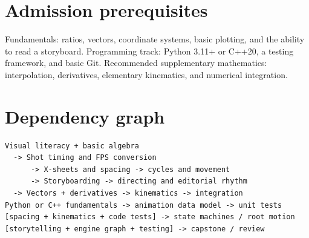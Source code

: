 \documentclass[10pt,letterpaper]{article}
\begin{document}
\makedoctitle
\makedocsummary
\tableofcontents\clearpage
\section{Admission prerequisites}
Fundamentals: ratios, vectors, coordinate systems, basic plotting, and the ability to read a storyboard. Programming track: Python 3.11+ or C++20, a testing framework, and basic Git. Recommended supplementary mathematics: interpolation, derivatives, elementary kinematics, and numerical integration.
\section{Dependency graph}
\begin{verbatim}
Visual literacy + basic algebra
  -> Shot timing and FPS conversion
      -> X-sheets and spacing -> cycles and movement
      -> Storyboarding -> directing and editorial rhythm
  -> Vectors + derivatives -> kinematics -> integration
Python or C++ fundamentals -> animation data model -> unit tests
[spacing + kinematics + code tests] -> state machines / root motion
[storytelling + engine graph + testing] -> capstone / review
\end{verbatim}
\end{document}

